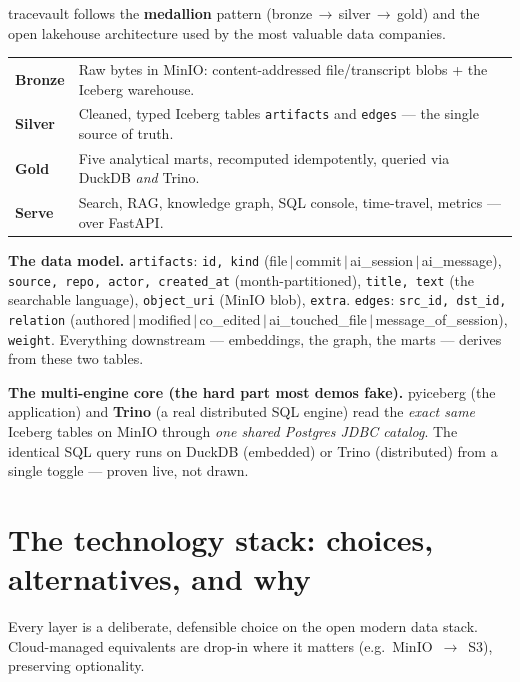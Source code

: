\documentclass[11pt]{article}
\newcommand{\kw}[1]{\textcolor{tvaccent}{\textbf{#1}}}
\newcommand{\code}[1]{{\small\texttt{#1}}}
\newcommand{\callout}[1]{%
  \par\vspace{0.4em}\noindent\colorbox{tvlight}{\parbox{\dimexpr\linewidth-2\fboxsep}{\vspace{0.2em}#1\vspace{0.2em}}}\par\vspace{0.5em}}
\begin{document}
tracevault follows the \kw{medallion} pattern (bronze\,$\rightarrow$\,silver\,$\rightarrow$\,gold) and
the open lakehouse architecture used by the most valuable data companies.

\begin{center}
\renewcommand{\arraystretch}{1.35}
\begin{tabularx}{\linewidth}{>{\bfseries}l X}
\toprule
\textcolor{tvamber}{Bronze} & Raw bytes in MinIO: content-addressed file/transcript blobs + the Iceberg warehouse. \\
\textcolor{tvmuted}{Silver} & Cleaned, typed Iceberg tables \code{artifacts} and \code{edges} --- the single source of truth. \\
\textcolor{tvamber}{Gold} & Five analytical marts, recomputed idempotently, queried via DuckDB \emph{and} Trino. \\
\textcolor{tvaccent}{Serve} & Search, RAG, knowledge graph, SQL console, time-travel, metrics --- over FastAPI. \\
\bottomrule
\end{tabularx}
\end{center}

\noindent\textbf{The data model.} \code{artifacts}: \code{id, kind} (file\,$|$\,commit\,$|$\,ai\_session\,$|$\,ai\_message),
\code{source, repo, actor, created\_at} (month-partitioned), \code{title, text} (the searchable
language), \code{object\_uri} (MinIO blob), \code{extra}. \code{edges}: \code{src\_id, dst\_id, relation}
(authored\,$|$\,modified\,$|$\,co\_edited\,$|$\,ai\_touched\_file\,$|$\,message\_of\_session),
\code{weight}. Everything downstream --- embeddings, the graph, the marts --- derives from these two
tables.

\callout{\textbf{The multi-engine core (the hard part most demos fake).} pyiceberg (the application)
and \kw{Trino} (a real distributed SQL engine) read the \emph{exact same} Iceberg tables on MinIO
through \emph{one shared Postgres JDBC catalog}. The identical SQL query runs on DuckDB (embedded)
or Trino (distributed) from a single toggle --- proven live, not drawn.}

\section{The technology stack: choices, alternatives, and why}

Every layer is a deliberate, defensible choice on the open modern data stack. Cloud-managed
equivalents are drop-in where it matters (e.g.\ MinIO~$\to$~S3), preserving optionality.
\end{document}
